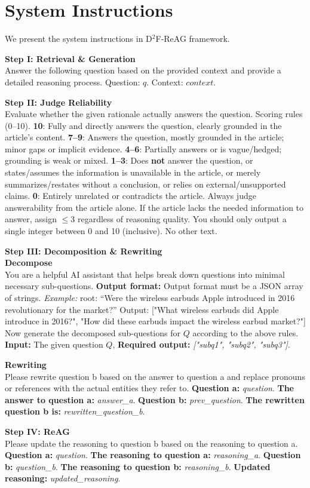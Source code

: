 \documentclass[11pt]{article}
\begin{document}
\section{System Instructions}
\label{sec:prompt}
We present the system instructions in D$^2$F-ReAG framework.


\textbf{Step I: Retrieval \& Generation}\\
Answer the following question based on the provided context and provide a detailed reasoning process.
Question: $q$. Context: $context$.

\textbf{Step II: Judge Reliability}\\
Evaluate whether the given rationale actually answers the question.
Scoring rules (0--10). \textbf{10}: Fully and directly answers the question, clearly grounded in the article's content. \textbf{7--9}: Answers the question, mostly grounded in the article; minor gaps or implicit evidence. \textbf{4--6}: Partially answers or is vague/hedged; grounding is weak or mixed. \textbf{1--3}: Does \textbf{not} answer the question, or states/assumes the information is unavailable in the article, or merely summarizes/restates without a conclusion, or relies on external/unsupported claims. \textbf{0}: Entirely unrelated or contradicts the article.
Always judge answerability from the article alone. If the article lacks the needed information to answer, assign $\le 3$ regardless of reasoning quality.
You should only output a single integer between 0 and 10 (inclusive). No other text.


\textbf{Step III: Decomposition \& Rewriting}\\
\textbf{Decompose}\\
You are a helpful AI assistant that helps break down questions into minimal necessary sub-questions.
\textbf{Output format:} Output format must be a JSON array of strings. 
\textit{Example:} root: ``Were the wireless earbuds Apple introduced in 2016 revolutionary for the market?''
Output: ["What wireless earbuds did Apple introduce in 2016?", "How did these earbuds impact the wireless earbud market?"]\\
Now generate the decomposed sub-questions for $Q$ according to the above rules.
\textbf{Input:} The given question $Q$,
\textbf{Required output:} \textit{["subq1", "subq2", "subq3"]}.\par\vspace{3pt}

\textbf{Rewriting}\\
Please rewrite question b based on the answer to question a and replace pronouns or references with the actual entities they refer to.
\textbf{Question a:} \textit{question}.
\textbf{The answer to question a:} \textit{answer\_a}.
\textbf{Question b:} \textit{prev\_question}.
\textbf{The rewritten question b is:} \textit{rewritten\_question\_b}.

\textbf{Step IV: ReAG}\\
Please update the reasoning to question b based on the reasoning to question a.
\textbf{Question a:} \textit{question}.
\textbf{The reasoning to question a:} \textit{reasoning\_a}.
\textbf{Question b:} \textit{question\_b}.
\textbf{The reasoning to question b:} \textit{reasoning\_b}.
\textbf{Updated reasoning:} \textit{updated\_reasoning}.
\end{document}

